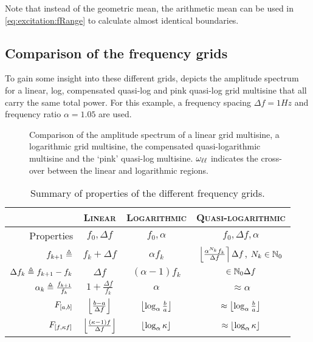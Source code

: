   Note that instead of the geometric mean, the arithmetic mean can be used in \eqref{eq:excitation:fRange} to calculate almost identical boundaries.

  \subsection{Comparison of the frequency grids}
  To gain some insight into these different grids,  depicts the amplitude spectrum for a linear, log, compensated quasi-log and pink quasi-log grid multisine that all carry the same total power.
  For this example, a frequency spacing $\Delta f = 1\unit{Hz}$ and frequency ratio $\alpha = 1.05$ are used.
  
  \begin{figure}[ht]
    \centering
      \setlength{}
      \setlength\figureheight{0.5\figurewidth}
    
    \caption[Amplitude spectrum for linear, logarithmic, quasi-logarithmic grids.]{Comparison of the amplitude spectrum of a linear grid multisine, a logarithmic grid multisine, the compensated quasi-logarithmic multisine and the `pink' quasi-log multisine.
    $\omega_{\ell \ell}$ indicates the cross-over between the linear and logarithmic regions. }%
    \label{fig:excitation:freqGrids}
  \end{figure}

  \begin{table}
  \centering
   \caption{Summary of  properties of the different frequency grids.}
   \label{tbl:excitation:gridProperties}
    \begin{tabular}{rccc} 
    \toprule
     & \textsc{Linear} & \textsc{Logarithmic} & \textsc{Quasi-logarithmic} \\
    \midrule
    Properties 
       & $f_0, \Delta f$ 
       & $f_0, \alpha$ 
       & $f_0, \Delta f, \alpha$\\
    \midrule
    $f_{k+1} \triangleq$ 
       & $f_{k} + \Delta f$ 
       & $\alpha f_{k}$
       & $\left\lfloor \frac{\alpha^{N_k} f_k}{\Delta f} \right\rceil \Delta f$,   $N_k \in \mathbb{N}_{0}$
       \\[5pt]
    $\Delta f_k \triangleq f_{k+1} - f_k$ 
       & $\Delta f$
       & $(\alpha - 1) f_k$
       & $ \in \mathbb{N}_{0} \Delta f$ \\[5pt]
    $\alpha_k \triangleq \frac{f_{k+1}}{f_k}$ 
       & $1 + \frac{\Delta f}{f_k}$ 
       & $\alpha$ 
       & $\approx \alpha $ \\[5pt]
    $F_{\left[ a,b \right]}$
       & $\left\lfloor \frac{b - a}{\Delta f} \right\rfloor$
       & $\left\lfloor \log_{\alpha} \frac{b}{a} \right\rfloor$
       & $\approx \left\lfloor \log_{\alpha} \frac{b}{a} \right\rfloor$\\[5pt]
    $F_{\left[ f, \kappa f \right]}$
      & $\left\lfloor \frac{(\kappa - 1)f}{\Delta f} \right\rfloor$
      & $\left\lfloor \log_{\alpha} \kappa \right\rfloor$
      & $\approx \left\lfloor \log_{\alpha} \kappa \right\rfloor$\\[5pt]
    \bottomrule
    \end{tabular}
  \end{table}

